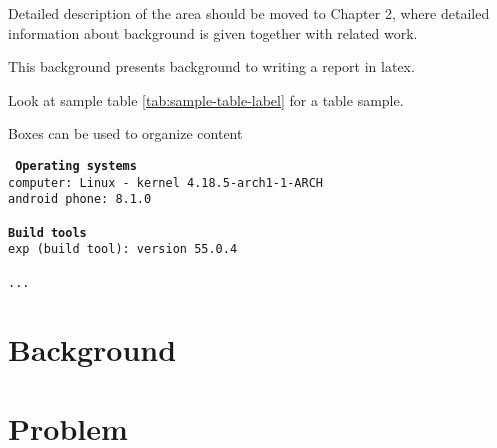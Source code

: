 Detailed description of the area should be moved to Chapter 2, where detailed information about background is given together with related work.




This background presents background to writing a report in latex.



Look at sample table \ref{tab:sample-table-label} for a table sample.



Boxes can be used to organize content

\begin{tcolorbox}[title={Development environment for prototype}]
	\tt{
		\textbf{Operating systems }\\
		computer: Linux - kernel 4.18.5-arch1-1-ARCH\\
		android phone: 8.1.0\\
		~\\
		\textbf{Build tools}\\
		exp (build tool): version 55.0.4\\
		~\\
		...
	}
\end{tcolorbox}

\section{Background}

\section{Problem}





